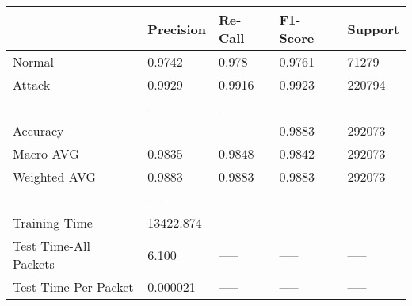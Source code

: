 \begin{tabular}{lllll}
\toprule
{} &  Precision & Re-Call & F1-Score & Support \\
\midrule
Normal                &     0.9742 &   0.978 &   0.9761 &   71279 \\
Attack                &     0.9929 &  0.9916 &   0.9923 &  220794 \\
-----                 &      ----- &   ----- &    ----- &   ----- \\
Accuracy              &            &         &   0.9883 &  292073 \\
Macro AVG             &     0.9835 &  0.9848 &   0.9842 &  292073 \\
Weighted AVG          &     0.9883 &  0.9883 &   0.9883 &  292073 \\
-----                 &      ----- &   ----- &    ----- &   ----- \\
Training Time         &  13422.874 &   ----- &    ----- &   ----- \\
Test Time-All Packets &      6.100 &   ----- &    ----- &   ----- \\
Test Time-Per Packet  &   0.000021 &   ----- &    ----- &   ----- \\
\bottomrule
\end{tabular}
